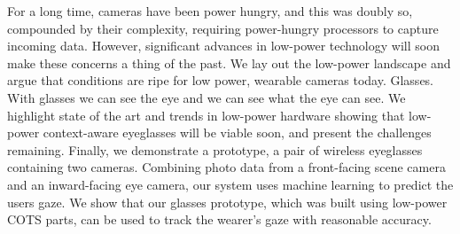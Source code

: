 For a long time, cameras have been power hungry, and this was doubly so, compounded by their complexity, requiring power-hungry processors to capture incoming data.  However, significant advances in low-power technology will soon make these concerns a thing of the past.  We lay out the low-power landscape and argue that conditions are ripe for low power, wearable cameras today.  Glasses.  With glasses we can see the eye and we can see what the eye can see.  We highlight state of the art and trends in low-power hardware showing that low-power context-aware eyeglasses will be viable soon, and present the challenges remaining.  Finally, we demonstrate a prototype, a pair of wireless eyeglasses containing two cameras.  Combining photo data from a front-facing scene camera and an inward-facing eye camera, our system uses machine learning to predict the users gaze.  We show that our glasses prototype, which was built using low-power COTS parts, can be used to track the wearer's gaze with reasonable accuracy.


